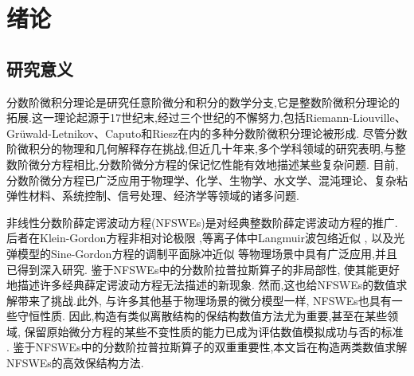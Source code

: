 \chapter[绪论]{绪论}

\section{研究意义}

分数阶微积分理论是研究任意阶微分和积分的数学分支,它是整数阶微积分理论的拓展.这一理论起源于17世纪末,经过三个世纪的不懈努力,包括Riemann-Liouville、Grüwald-Letnikov、Caputo和Riesz在内的多种分数阶微积分理论被形成\cite{samkoFractionalIntegralsDerivatives1993}.
尽管分数阶微积分的物理和几何解释存在挑战,但近几十年来,多个学科领域的研究表明,与整数阶微分方程相比,分数阶微分方程的保记忆性能有效地描述某些复杂问题.
目前,分数阶微分方程已广泛应用于物理学、化学、生物学、水文学、混沌理论、复杂粘弹性材料、系统控制、信号处理、经济学等领域的诸多问题\cite{liIntroductionFractionalCalculus2015,HandbookDifferentialEquations2008,brychkovIndefiniteIntegrals2008,zhangMassBalanceBased2005,carrerasAnomalousDiffusionExit2001,maginSolvingFractionalOrder2009,zaslavskySelfsimilarTransportIncomplete1993,sunRandomorderFractionalDifferential2011}.%

非线性分数阶薛定谔波动方程(NFSWEs)是对经典整数阶薛定谔波动方程的推广.
后者在Klein-Gordon方程非相对论极限 \cite{tsutsumiNonrelativisticApproximationNonlinear1984,machiharaNonrelativisticLimitEnergy2002},等离子体中Langmuir波包络近似 \cite{colinSemidiscretizationTimeNonlinear1998},
以及光弹模型的Sine-Gordon方程的调制平面脉冲近似 \cite{baoComparisonsSineGordonPerturbed2010,xinModelingLightBullets2000}等物理场景中具有广泛应用,并且已得到深入研究\cite{zhangConservativeNumericalScheme2003,baoUniformErrorEstimates2012,chengSeveralConservativeCompact2018,brugnanoClassEnergyconservingHamiltonian2018}.
鉴于NFSWEs中的分数阶拉普拉斯算子的非局部性, 使其能更好地描述许多经典薛定谔波动方程无法描述的新现象.
然而,这也给NFSWEs的数值求解带来了挑战.此外, 与许多其他基于物理场景的微分模型一样, NFSWEs也具有一些守恒性质. 
因此,构造有类似离散结构的保结构数值方法尤为重要,甚至在某些领域, 保留原始微分方程的某些不变性质的能力已成为评估数值模拟成功与否的标准 \cite{liFiniteDifferenceCalculus1995}.
鉴于NFSWEs中的分数阶拉普拉斯算子的双重重要性,本文旨在构造两类数值求解NFSWEs的高效保结构方法.

